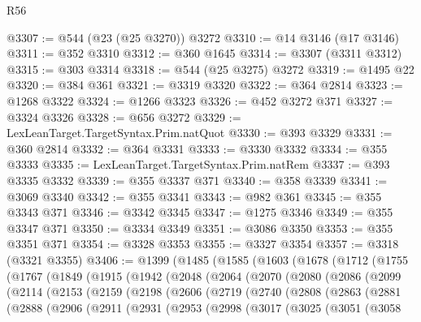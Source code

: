 \begin{lexlean}{R56}
\begin{coremodule}
@3307 := @544 (@23 (@25 @3270)) @3272
@3310 := @14 @3146 (@17 @3146)
@3311 := @352 @3310
@3312 := @360 @1645
@3314 := @3307 (@3311 @3312)
@3315 := @303 @3314
@3318 := @544 (@25 @3275) @3272
@3319 := @1495 @22
@3320 := @384 @361
@3321 := @3319 @3320
@3322 := @364 @2814
@3323 := @1268 @3322
@3324 := @1266 @3323
@3326 := @452 @3272 @371
@3327 := @3324 @3326
@3328 := @656 @3272
@3329 := LexLeanTarget.TargetSyntax.Prim.natQuot
@3330 := @393 @3329
@3331 := @360 @2814
@3332 := @364 @3331
@3333 := @3330 @3332
@3334 := @355 @3333
@3335 := LexLeanTarget.TargetSyntax.Prim.natRem
@3337 := @393 @3335 @3332
@3339 := @355 @3337 @371
@3340 := @358 @3339
@3341 := @3069 @3340
@3342 := @355 @3341
@3343 := @982 @361
@3345 := @355 @3343 @371
@3346 := @3342 @3345
@3347 := @1275 @3346
@3349 := @355 @3347 @371
@3350 := @3334 @3349
@3351 := @3086 @3350
@3353 := @355 @3351 @371
@3354 := @3328 @3353
@3355 := @3327 @3354
@3357 := @3318 (@3321 @3355)
@3406 := @1399
    (@1485
      (@1585
        (@1603
          (@1678
            (@1712
              (@1755
                (@1767
                  (@1849
                    (@1915
                      (@1942
                        (@2048
                          (@2064
                            (@2070
                              (@2080
                                (@2086
                                  (@2099
                                    (@2114
                                      (@2153
                                        (@2159
                                          (@2198
                                            (@2606
                                              (@2719
                                                (@2740
                                                  (@2808
                                                    (@2863
                                                      (@2881
                                                        (@2888
                                                          (@2906
                                                            (@2911
                                                              (@2931
                                                                (@2953
                                                                  (@2998
                                                                    (@3017
                                                                      (@3025
                                                                        (@3051
                                                                          (@3058

\end{coremodule}
\end{lexlean}
